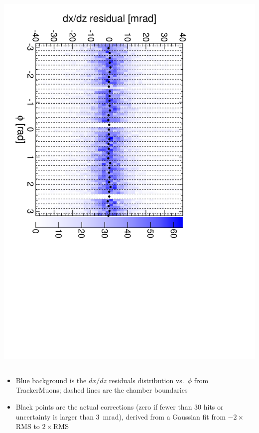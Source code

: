\documentclass[compress]{beamer}
\begin{document}
\begin{frame}
\begin{columns}
\includegraphics[height=\linewidth, angle=90]{iter02_mep12.pdf}
\end{columns}

\begin{itemize}
\item Blue background is the $dx/dz$ residuals distribution
  vs.\ $\phi$ from TrackerMuons; dashed lines are the chamber boundaries
\item Black points are the actual corrections (zero if fewer than 30
  hits or uncertainty is larger than 3~mrad), derived from a Gaussian
  fit from $-2\times$RMS to $2\times$RMS
\end{itemize}
\end{frame}
\end{document}
